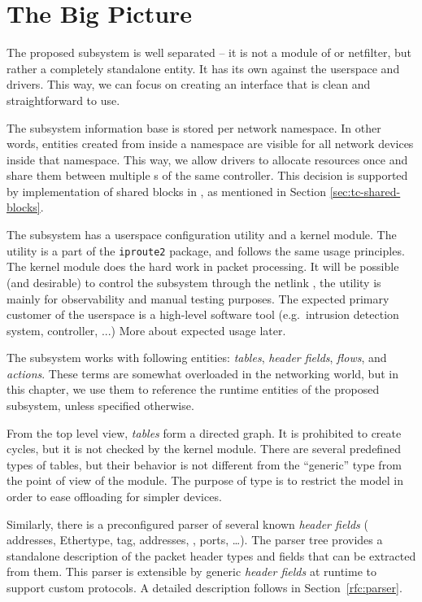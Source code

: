 \section{The Big Picture}

The proposed subsystem is well separated -- it is not a module of
 or netfilter, but rather a completely standalone entity. It has its
own  against the userspace and drivers. This way, we can focus on creating
an interface that is clean and straightforward to use.

The subsystem information base is stored per network namespace. In other
words, entities created from inside a namespace are visible for all network devices
inside that namespace. This way, we allow drivers to allocate resources once and
share them between multiple \netdev s of the same controller. This decision
is supported by implementation of shared blocks in , as mentioned in
Section \ref{sec:tc-shared-blocks}.

The subsystem has a userspace configuration utility and a kernel module.
The utility is a part of the \texttt{iproute2} package, and follows
the same usage principles. The kernel module does the hard work in packet
processing. It will be possible (and desirable) to control the subsystem
through the netlink , the utility is mainly for observability and manual testing
purposes. The expected primary customer of the userspace  is a high-level
software tool (e.g.\ intrusion detection system,  controller, ...) More
about expected usage later.

The subsystem works with following entities: \emph{tables}, \emph{header
fields}, \emph{flows}, and \emph{actions}. These terms are somewhat overloaded in
the networking world, but in this chapter, we use them to reference the runtime
entities of the proposed subsystem, unless specified otherwise.

From the top level view, \emph{tables} form a directed graph. It
is prohibited to create cycles, but it is not checked by the kernel
module. There are several predefined types of tables, but their
behavior is not different from the ``generic'' type from the point of
view of the module. The purpose of type is to restrict the model in order to
ease offloading for simpler devices.

Similarly, there is a preconfigured parser of several known \emph{header fields}
( addresses, Ethertype,  tag,  addresses, , ports,
\dots). The parser tree provides a standalone
description of the packet header types and fields that can be extracted from them. This
parser is extensible by generic \emph{header fields} at runtime to support
custom protocols. A detailed description follows in Section~\ref{rfc:parser}.

